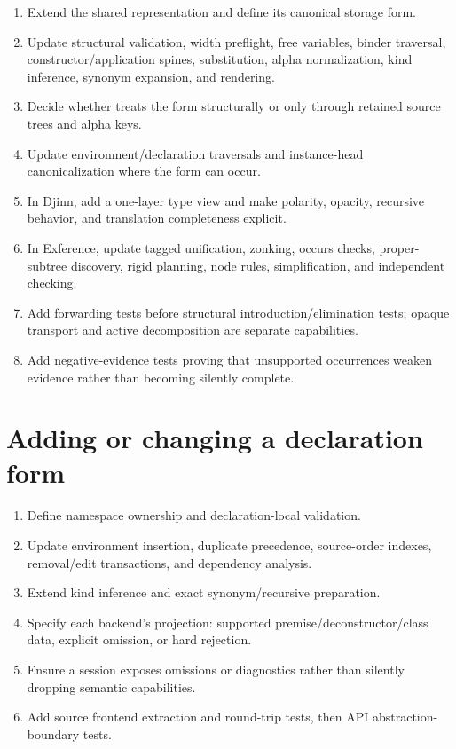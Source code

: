 \documentclass[10pt,letterpaper,oneside]{report}
\newcommand{\code}[1]{\texttt{\detokenize{#1}}}
\begin{document}
\begin{enumerate}
  \item Extend the shared \code{Type} representation and define its canonical storage form.
  \item Update structural validation, width preflight, free variables, binder traversal, constructor/application spines, substitution, alpha normalization, kind inference, synonym expansion, and rendering.
  \item Decide whether \code{TypeAtom} treats the form structurally or only through retained source trees and alpha keys.
  \item Update environment/declaration traversals and instance-head canonicalization where the form can occur.
  \item In Djinn, add a one-layer type view and make polarity, opacity, recursive behavior, and translation completeness explicit.
  \item In Exference, update tagged unification, zonking, occurs checks, proper-subtree discovery, rigid planning, node rules, simplification, and independent checking.
  \item Add forwarding tests before structural introduction/elimination tests; opaque transport and active decomposition are separate capabilities.
  \item Add negative-evidence tests proving that unsupported occurrences weaken evidence rather than becoming silently complete.
\end{enumerate}

\section{Adding or changing a declaration form}

\begin{enumerate}
  \item Define namespace ownership and declaration-local validation.
  \item Update environment insertion, duplicate precedence, source-order indexes, removal/edit transactions, and dependency analysis.
  \item Extend kind inference and exact synonym/recursive preparation.
  \item Specify each backend's projection: supported premise/deconstructor/class data, explicit omission, or hard rejection.
  \item Ensure a session exposes omissions or diagnostics rather than silently dropping semantic capabilities.
  \item Add source frontend extraction and round-trip tests, then API abstraction-boundary tests.
\end{enumerate}
\end{document}

